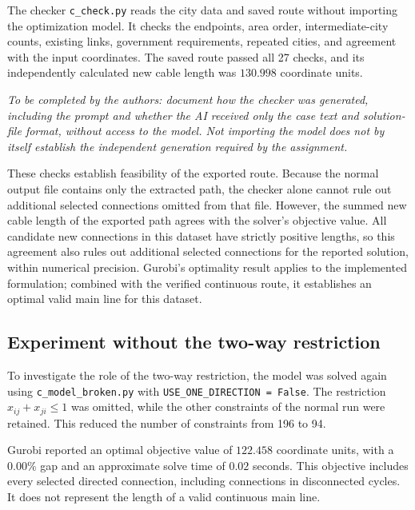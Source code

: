 \documentclass[11pt,a4paper]{article}
\begin{document}
The checker \texttt{c\_check.py} reads the city data and saved route without importing the optimization model. It checks the endpoints, area order, intermediate-city counts, existing links, government requirements, repeated cities, and agreement with the input coordinates. The saved route passed all 27 checks, and its independently calculated new cable length was $130.998$ coordinate units.

\textit{To be completed by the authors: document how the checker was generated, including the prompt and whether the AI received only the case text and solution-file format, without access to the model. Not importing the model does not by itself establish the independent generation required by the assignment.}

These checks establish feasibility of the exported route. Because the normal output file contains only the extracted path, the checker alone cannot rule out additional selected connections omitted from that file. However, the summed new cable length of the exported path agrees with the solver's objective value. All candidate new connections in this dataset have strictly positive lengths, so this agreement also rules out additional selected connections for the reported solution, within numerical precision. Gurobi's optimality result applies to the implemented formulation; combined with the verified continuous route, it establishes an optimal valid main line for this dataset.

\subsection{Experiment without the two-way restriction}
To investigate the role of the two-way restriction, the model was solved again using \texttt{c\_model\_broken.py} with \texttt{USE\_ONE\_DIRECTION = False}. The restriction $x_{ij}+x_{ji}\le1$ was omitted, while the other constraints of the normal run were retained. This reduced the number of constraints from 196 to 94.

Gurobi reported an optimal objective value of $122.458$ coordinate units, with a $0.00\%$ gap and an approximate solve time of $0.02$ seconds. This objective includes every selected directed connection, including connections in disconnected cycles. It does not represent the length of a valid continuous main line.
\end{document}
